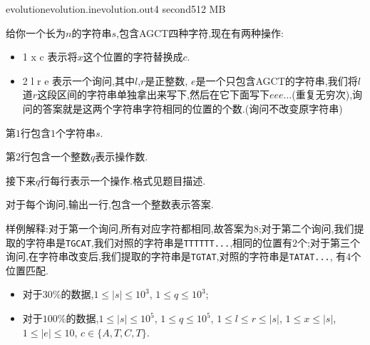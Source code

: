 \documentclass[11pt,a4paper,oneside]{article}
\begin{document}
\begin{problem}{evolution}{evolution.in}{evolution.out}{4 second}{512 MB}
    
    给你一个长为$n$的字符串$s$,包含AGCT四种字符,现在有两种操作:
    
    \begin{itemize}
    	\item 1 x c  表示将$x$这个位置的字符替换成$c$.
    	\item 2 l r e  表示一个询问,其中$l$,$r$是正整数, $e$是一个只包含AGCT的字符串,我们将$l$道$r$这段区间的字符串单独拿出来写下,然后在它下面写下$eee\dots$(重复无穷次),询问的答案就是这两个字符串字符相同的位置的个数.(询问不改变原字符串)
    \end{itemize}

    \InputFile

    第$1$行包含$1$个字符串$s$.
    
    第$2$行包含一个整数$q$表示操作数.
    
    接下来$q$行每行表示一个操作.格式见题目描述.

    \OutputFile

	对于每个询问,输出一行,包含一个整数表示答案.

    \Example

    \begin{example}
    \end{example}

	样例解释:对于第一个询问,所有对应字符都相同,故答案为$8$;对于第二个询问,我们提取的字符串是\verb|TGCAT|,我们对照的字符串是\verb|TTTTTT...|,相同的位置有$2$个;对于第三个询问,在字符串改变后,我们提取的字符串是\verb|TGTAT|,对照的字符串是\verb|TATAT...|, 有$4$个位置匹配.
	
	\begin{example}
	\end{example}

    \Note
    
    \begin{itemize}
    	\item 对于$30\%$的数据,$1 \leq \vert s \vert \leq 10^3$, $1 \leq q \leq 10^3$;
        \item 对于$100\%$的数据,$1 \leq \vert s \vert \leq 10^5$, $1 \leq q \leq 10^5$, $1 \leq l \leq r \leq \vert s \vert$, $1 \leq x \leq \vert s \vert$, $1 \leq \vert e \vert  \leq 10$, $c \in \{A, T, C, T\}$.
    \end{itemize}

\end{problem}
\end{document}
